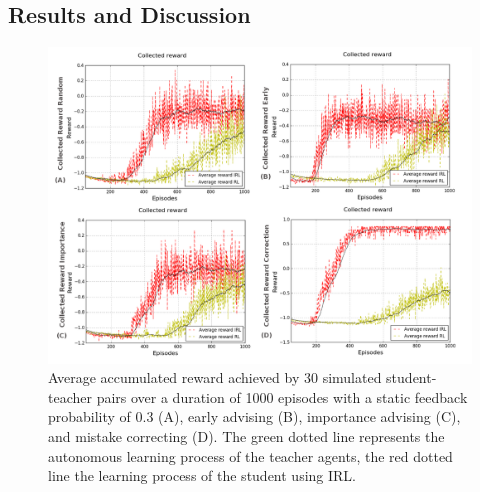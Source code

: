 \documentclass[12pt,twoside]{article}
\theoremstyle{plain}
\theoremstyle{definition}
\theoremstyle{remark}
\begin{document}
\subsection{Results and Discussion}

\begin{figure}[H]
      \centering
      \includegraphics[scale=0.5]{collected_reward_results.png}     
      \caption{\scriptsize Average accumulated reward achieved by 30 simulated student-teacher pairs over a duration of 1000 episodes with a static feedback probability of 0.3 (A), early advising (B), importance advising (C), and mistake correcting (D). The green dotted line represents the autonomous learning process of the teacher agents, the red dotted line the learning process of the student using IRL.}
      \label{collectedrewardresults}
\end{figure}
\end{document}
